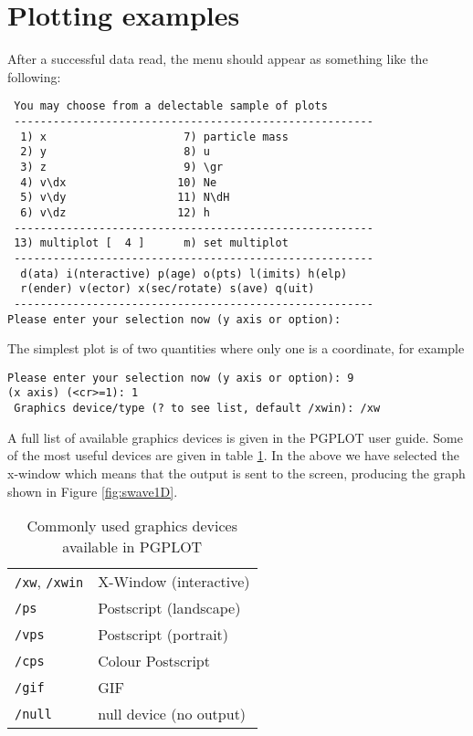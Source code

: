 \documentclass[a4paper,12pt]{article}
\begin{document}
\section{Plotting examples}
After a successful data read, the menu should appear as something like the
following:
\begin{verbatim}
 You may choose from a delectable sample of plots
 -------------------------------------------------------
  1) x                     7) particle mass
  2) y                     8) u
  3) z                     9) \gr
  4) v\dx                 10) Ne
  5) v\dy                 11) N\dH
  6) v\dz                 12) h
 -------------------------------------------------------
 13) multiplot [  4 ]      m) set multiplot
 -------------------------------------------------------
  d(ata) i(nteractive) p(age) o(pts) l(imits) h(elp)
  r(ender) v(ector) x(sec/rotate) s(ave) q(uit)
 -------------------------------------------------------
Please enter your selection now (y axis or option):
\end{verbatim}
The simplest plot is of two quantities where only one is a coordinate, for
example
\begin{verbatim}
Please enter your selection now (y axis or option): 9
(x axis) (<cr>=1): 1
 Graphics device/type (? to see list, default /xwin): /xw
\end{verbatim}
 A full list of available graphics devices is given in the PGPLOT user guide.
Some of the most useful devices are given in table \ref{tab:devices}. In the
above we have selected the x-window which means that the output is sent to the
screen, producing the graph shown in Figure \ref{fig:swave1D}.
\begin{table}[h]
\centering
\begin{tabular}{|l|l|}
\hline
\verb+/xw+, \verb+/xwin+ & X-Window (interactive) \\
\verb+/ps+ & Postscript (landscape) \\
\verb+/vps+ & Postscript (portrait) \\
\verb+/cps+ & Colour Postscript \\
\verb+/gif+ & GIF \\
\verb+/null+ & null device (no output) \\
\hline
\end{tabular}
\caption{Commonly used graphics devices available in PGPLOT}
\label{tab:devices}
\end{table}
\end{document}
